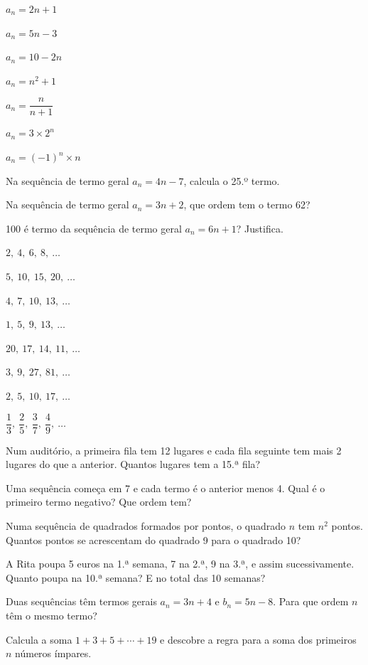 \documentclass[12pt]{article}
\begin{document}
\begin{exercicios}
  \item $a_n = 2n + 1$
  \item $a_n = 5n - 3$
  \item $a_n = 10 - 2n$
  \item $a_n = n^2 + 1$
  \item $a_n = \dfrac{n}{n + 1}$
  \item $a_n = 3 \times 2^{n}$
  \item $a_n = (-1)^n \times n$
  \item Na sequência de termo geral $a_n = 4n - 7$, calcula o 25.º termo.
  \item Na sequência de termo geral $a_n = 3n + 2$, que ordem tem o termo 62?
  \item 100 é termo da sequência de termo geral $a_n = 6n + 1$? Justifica.
\end{exercicios}

\begin{exercicios}
  \item $2,\ 4,\ 6,\ 8,\ \ldots$
  \item $5,\ 10,\ 15,\ 20,\ \ldots$
  \item $4,\ 7,\ 10,\ 13,\ \ldots$
  \item $1,\ 5,\ 9,\ 13,\ \ldots$
  \item $20,\ 17,\ 14,\ 11,\ \ldots$
  \item $3,\ 9,\ 27,\ 81,\ \ldots$
  \item $2,\ 5,\ 10,\ 17,\ \ldots$
  \item $\dfrac{1}{3},\ \dfrac{2}{5},\ \dfrac{3}{7},\ \dfrac{4}{9},\ \ldots$
\end{exercicios}

\begin{exercicios}
  \item Num auditório, a primeira fila tem 12 lugares e cada fila seguinte tem mais 2 lugares do que a anterior. Quantos lugares tem a 15.ª fila?
  \item Uma sequência começa em 7 e cada termo é o anterior menos 4. Qual é o primeiro termo negativo? Que ordem tem?
  \item Numa sequência de quadrados formados por pontos, o quadrado $n$ tem $n^2$ pontos. Quantos pontos se acrescentam do quadrado 9 para o quadrado 10?
  \item A Rita poupa 5 euros na 1.ª semana, 7 na 2.ª, 9 na 3.ª, e assim sucessivamente. Quanto poupa na 10.ª semana? E no total das 10 semanas?
  \item Duas sequências têm termos gerais $a_n = 3n + 4$ e $b_n = 5n - 8$. Para que ordem $n$ têm o mesmo termo?
  \item Calcula a soma $1 + 3 + 5 + \cdots + 19$ e descobre a regra para a soma dos primeiros $n$ números ímpares.
\end{exercicios}
\end{document}
